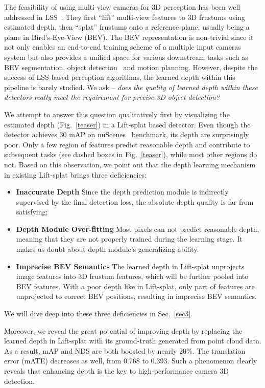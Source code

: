 \documentclass[twocolumn,letterpaper]{article}
\begin{document}
The feasibility of using multi-view cameras for 3D perception has been well addressed in LSS~\cite{philion2020lift}. They first ``lift'' multi-view features to 3D frustums using estimated depth, then ``splat'' frustums onto a reference plane, usually being a plane in Bird's-Eye-View (BEV). The BEV representation is non-trivial since it not only enables an end-to-end training scheme of a multiple input cameras system but also provides a unified space for various downstream tasks such as BEV segmentation, object detection~\cite{huang2021bevdet, li2022bevformer} and motion planning. However, despite the success of LSS-based perception algorithms, the learned depth within this pipeline is barely studied. We ask -- \emph{does the quality of learned depth within these detectors really meet the requirement for precise 3D object detection?}

We attempt to answer this question qualitatively first by visualizing the estimated depth (Fig.~\ref{teaser}) in a Lift-splat based detector. Even though the detector achieves 30 mAP on nuScenes~\cite{caesar2020nuscenes} benchmark, its depth are surprisingly poor. Only a few region of features predict reasonable depth and contribute to subsequent tasks (see dashed boxes in Fig.~\ref{teaser}), while most other regions do not. Based on this observation, we point out that the depth learning mechanism in existing Lift-splat brings three deficiencies:

\begin{itemize}
\item \textbf{Inaccurate Depth} Since the depth prediction module is indirectly supervised by the final detection loss, the absolute depth quality is far from satisfying;
\item \textbf{Depth Module Over-fitting} Most pixels can not predict reasonable depth, meaning that they are not properly trained during the learning stage. It makes us doubt about depth module's generalizing ability.
\item \textbf{Imprecise BEV Semantics} The learned depth in Lift-splat unprojects image features into 3D frustum features, which will be further pooled into BEV features. With a poor depth like in Lift-splat, only part of features are unprojected to correct BEV positions, resulting in imprecise BEV semantics.
\end{itemize}

\noindent We will dive deep into these three deficiencies in Sec.~\ref{sec3}. 

Moreover, we reveal the great potential of improving depth by replacing the learned depth in Lift-splat with its ground-truth generated from point cloud data. As a result, mAP and NDS are both boosted by nearly 20\%. The translation error (mATE) decreases as well, from 0.768 to 0.393. Such a phenomenon clearly reveals that enhancing depth is the key to high-performance camera 3D detection.
\end{document}
